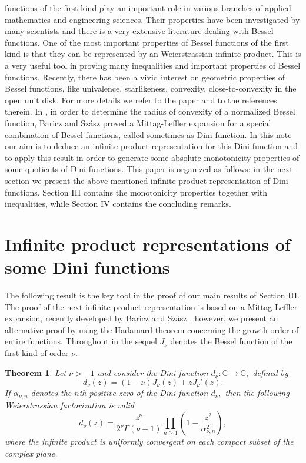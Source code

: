 \documentclass[journal]{IEEEtran}
\newtheorem{theorem}{Theorem}
\begin{document}
 functions of the first kind play an important role in various branches of applied mathematics and engineering sciences. Their properties have been investigated by many scientists and there is a very extensive literature dealing with Bessel functions. One of the most important properties of Bessel functions of the first kind is that they can be represented by an Weierstrassian infinite product. This is a very useful tool in proving many inequalities and important properties of Bessel functions. Recently, there has been a vivid interest on geometric properties of Bessel functions, like univalence, starlikeness, convexity, close-to-convexity in the open unit disk. For more details we refer to the paper \cite{szasz} and to the references therein. In \cite{szasz}, in order to determine the radius of convexity of a normalized Bessel function, Baricz and Sz\'asz proved a Mittag-Leffler expansion for a special combination of Bessel functions, called sometimes as Dini function. In this note our aim is to deduce an infinite product representation for this Dini function and to apply this result in order to generate some absolute monotonicity properties of some quotients of Dini functions. This paper is organized as follows: in the next section we present the above mentioned infinite product representation of Dini functions. Section III contains the monotonicity properties together with inequalities, while Section IV contains the concluding remarks.

\section{Infinite product representations of some Dini functions}

The following result is the key tool in the proof of our main results of Section III. The proof of the next infinite product representation is based on a Mittag-Leffler expansion, recently developed by Baricz and Sz\'asz \cite[Lemma 4]{szasz}, however, we present an alternative proof by using the Hadamard theorem concerning the growth order of entire functions. Throughout in the sequel $J_{\nu}$ denotes the Bessel function of the first kind of order $\nu.$

\begin{theorem}
{\em Let $\nu>-1$ and consider the Dini function $d_{\nu}:\mathbb{C}\to\mathbb{C},$ defined by $$d_{\nu}(z)=(1-\nu)J_{\nu}(z)+zJ_{\nu}'(z).$$ If $\alpha_{\nu,n}$ denotes the $n$th positive zero of the Dini function $d_{\nu},$ then the following Weierstrassian factorization is valid
\begin{equation}\label{product}
d_{\nu}(z)=\frac{z^{\nu}}{2^{\nu}\Gamma(\nu+1)}\prod_{n\geq1}\left(1-\frac{z^2}{\alpha_{\nu,n}^2}\right),
\end{equation}
where the infinite product is uniformly convergent on each compact subset of the complex plane.}
\end{theorem}
\end{document}
